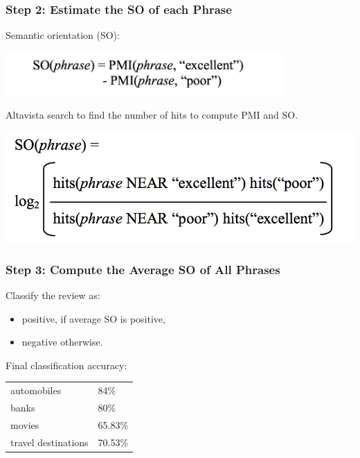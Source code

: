 \documentclass[t]{beamer}
\begin{document}
\begin{frame} \frametitle{Step 2: Estimate the SO of each Phrase} %


Semantic orientation (SO):

\begin{center}
     \includegraphics[width=0.8\textwidth]{turney03}
\end{center}

Altavista search to find the number of hits to compute PMI and SO.

\begin{center}
     \includegraphics[width=0.8 \textwidth]{turney04}
\end{center}

\end{frame} 

\begin{frame} \frametitle{Step 3: Compute the Average SO of All
    Phrases} %

Classify the review as:
\begin{itemize}
\item positive, if average SO is positive, 
\item negative otherwise.
\end{itemize}

\vfill
Final classification accuracy: \\
\begin{tabular}{l l}
automobiles & 84\% \\
banks & 80\% \\
movies & 65.83\% \\
travel destinations & 70.53\%
\end{tabular}

\end{frame} 
\end{document}
